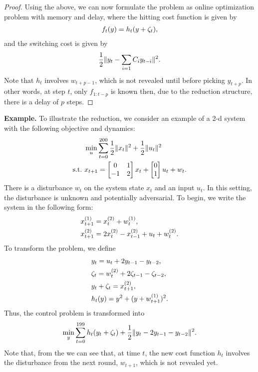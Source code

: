 \begin{proof}
Using the above, we can now formulate the problem as online optimization problem with memory and delay, where the hitting cost function is given by
\begin{align}
    f_t(y)=h_t(y+\zeta_t),\notag
\end{align}
and the switching cost is given by
\begin{align}
    \frac{1}{2}\|y_t-\sum_{i=1}C_iy_{t-i}\|^2.\notag
\end{align}
Note that $h_t$ involves $w_{t+p-1}$, which is not revealed until before picking $y_{t+p}$. In other words, at step $t$, only $f_{1:t-p}$ is known then, due to the reduction structure, there is a delay of $p$ steps. 
\end{proof}

\textbf{Example.} To illustrate the reduction, we consider an example of a 2-d system with the following objective and dynamics:
\begin{align}
    &\min_u\sum_{t=0}^{200}\frac{1}{2}\|x_t\|^2+\frac{1}{2}\|u_t\|^2\notag\\
 \mathrm{s.t.}~&x_{t+1}=\begin{bmatrix}
    0 & 1 \\
    -1 & 2
    \end{bmatrix}x_t+\begin{bmatrix}
     0 \\ 1
    \end{bmatrix}u_t+w_t\notag.
\end{align}
There is a disturbance $w_t$ on the system state $x_t$ and an input $u_t$. In this setting, the disturbance is unknown and potentially adversarial. To begin, we write the system in the following form:
\begin{align}
    x_{t+1}^{(1)}&=x_t^{(2)}+w_t^{(1)},\notag\\
    x_{t+1}^{(2)}&=2x_t^{(2)}-x_{t-1}^{(2)}+u_t+w_t^{(2)}\notag.
\end{align}
To transform the problem, we define
\begin{align}
    &y_t=u_t+2y_{t-1}-y_{t-2},\notag\\
    &\zeta_t=w_t^{(2)}+2\zeta_{t-1}-\zeta_{t-2},\notag\\
    &y_t+\zeta_t=x_{t+1}^{(2)},\notag\\
    &h_t(y)=y^2+(y+w_{t+1}^{(1)})^2.\label{example-delay-function}
\end{align}
Thus, the control problem is transformed into
\begin{align}
    \min_y\sum_{t=0}^{199}h_t(y_t+\zeta_t)+\frac{1}{2}\|y_t-2y_{t-1}-y_{t-2}\|^2.\notag
\end{align}
Note that, from the  we can see that, at time $t$, the new cost function $h_t$ involves the disturbance from the next round, $w_{t+1}$, which is not revealed yet.

